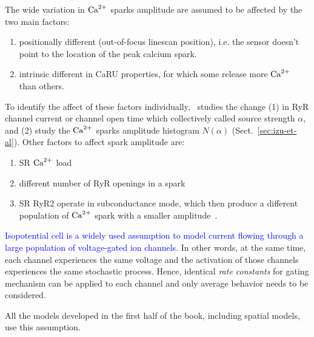 The wide variation in ${\text{Ca}^{2+}}$ sparks amplitude are assumed to be
affected by the two main factors:
\begin{enumerate}
\item positionally different (out-of-focus linescan position),
  i.e. the sensor doesn't point to the location of the peak calcium
  spark.
\item intrinsic different in CaRU properties, for which some release
  more ${\text{Ca}^{2+}}$ than others.
\end{enumerate}
To identify the affect of these factors individually,~\citep{izu1998}
studies the change (1) in RyR channel current or channel open time
which collectively called source strength $\alpha$, and (2) study the
${\text{Ca}^{2+}}$ sparks amplitude histogram $N(\alpha)$
(Sect.~\ref{sec:izu-et-al}). Other factors to affect spark amplitude
are:
\begin{enumerate}
\item SR ${\text{Ca}^{2+}}$ load~\citep{satoh1997, gyorke1997, song1997}
\item different number of RyR openings in a spark~\citep{lipp1996}
\item SR RyR2 operate in subconductance mode, which then produce a
  different population of ${\text{Ca}^{2+}}$ spark with a smaller
  amplitude~\citep{xiao1997}.
\end{enumerate}


\begin{framed}
  \textcolor{blue}{Isopotential cell is a widely used assumption to
    model current flowing through a large population of voltage-gated
    ion channels}.
  In other words, at the same time, each channel experiences the same
  voltage and the activation of those channels experiences the same
  stochastic process. Hence, identical {\it rate constants} for gating
  mechanism can be applied to each channel and only average behavior
  needs to be considered.

  All the models developed in the first half of the book, including
  spatial models, use this assumption.
\end{framed}

